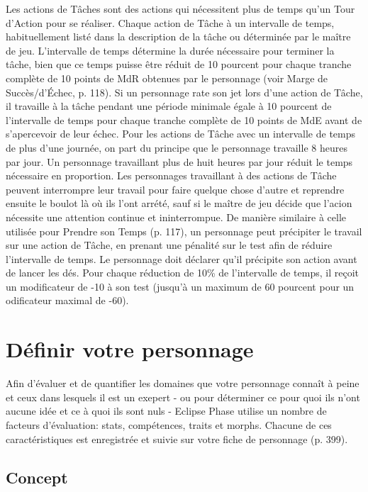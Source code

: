 Les actions de Tâches sont des actions qui nécessitent plus de temps qu'un Tour d'Action pour se réaliser. Chaque action de Tâche à un intervalle de temps, habituellement listé dans la description de la tâche ou déterminée par le maître de jeu. L'intervalle de temps détermine la durée nécessaire pour terminer la tâche, bien que ce temps puisse être réduit de 10 pourcent pour chaque tranche complète de 10 points de MdR obtenues par le personnage (voir Marge de Succès/d'Échec, p. 118). Si un personnage rate son jet lors d'une action de Tâche, il travaille à la tâche pendant une période minimale égale à 10 pourcent de l'intervalle de temps pour chaque tranche complète de 10 points de MdE avant de s'apercevoir de leur échec. Pour les actions de Tâche avec un intervalle de temps de plus d'une journée, on part du principe que le personnage travaille 8 heures par jour. Un personnage travaillant plus de huit heures par jour réduit le temps nécessaire en proportion. Les personnages travaillant à des actions de Tâche peuvent interrompre leur travail pour faire quelque chose d'autre et reprendre ensuite le boulot là où ils l'ont arrété, sauf si le maître de jeu décide que l'acion nécessite une attention continue et ininterrompue. De manière similaire à celle utilisée pour Prendre son Temps (p. 117), un personnage peut précipiter le travail sur une action de Tâche, en prenant une pénalité sur le test afin de réduire l'intervalle de temps. Le personnage doit déclarer qu'il précipite son action avant de lancer les dés. Pour chaque réduction de 10\% de l'intervalle de temps, il reçoit un modificateur de -10 à son test (jusqu'à un maximum de 60 pourcent pour un odificateur maximal de -60). 

\section{Définir votre personnage} \label{sec:defin-your-char} 

Afin d'évaluer et de quantifier les domaines que votre personnage connaît à peine et ceux dans lesquels il est un exepert - ou pour déterminer ce pour quoi ils n'ont aucune idée et ce à quoi ils sont nuls - Eclipse Phase utilise un nombre de facteurs d'évaluation: stats, compétences, traits et morphs. Chacune de ces caractéristiques est enregistrée et suivie sur votre fiche de personnage (p. 399). 

\subsection{Concept} \label{sec:concept} 

